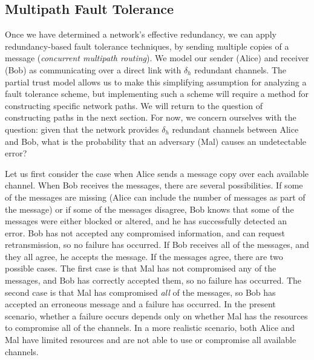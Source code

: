 \documentclass{sig-alternate-05-2015}
\begin{document}
\subsection{Multipath Fault Tolerance}

Once we have determined a network's effective redundancy,
we can apply redundancy-based fault tolerance techniques,
by sending multiple copies of a message
({\em concurrent multipath routing}).
We model our sender (Alice) and receiver (Bob) as
communicating over a direct link with $\delta_h$ redundant channels.
The partial trust model allows us to make this simplifying assumption
for analyzing a fault tolerance scheme,
but implementing such a scheme will require a method for constructing
specific network paths.
We will return to the question of constructing paths in the next section.
For now, we concern ourselves with the question:
given that the network provides $\delta_h$ redundant channels between
Alice and Bob,
what is the probability that an adversary (Mal) causes an undetectable
error?

Let us first consider the case when
Alice sends a message copy over each available channel.
When Bob receives the messages, there are several possibilities.
If some of the messages are missing
(Alice can include the number of messages as part of the message)
or if some of the messages disagree,
Bob knows that some of the messages were either blocked or altered,
and he has successfully detected an error.
Bob has not accepted any compromised information,
and can request retransmission, so no failure has occurred.
If Bob receives all of the messages, and they all agree,
he accepts the message.
If the messages agree, there are two possible cases.
The first case is that Mal has not compromised any of the messages,
and Bob has correctly accepted them, so no failure has occurred.
The second case is that Mal has compromised {\em all} of the messages,
so Bob has accepted an erroneous message and a failure has occurred.
In the present scenario,
whether a failure occurs depends only on whether Mal has the resources to
compromise all of the channels.
In a more realistic scenario,
both Alice and Mal have limited resources and are not able to use or
compromise all available channels.
\end{document}
